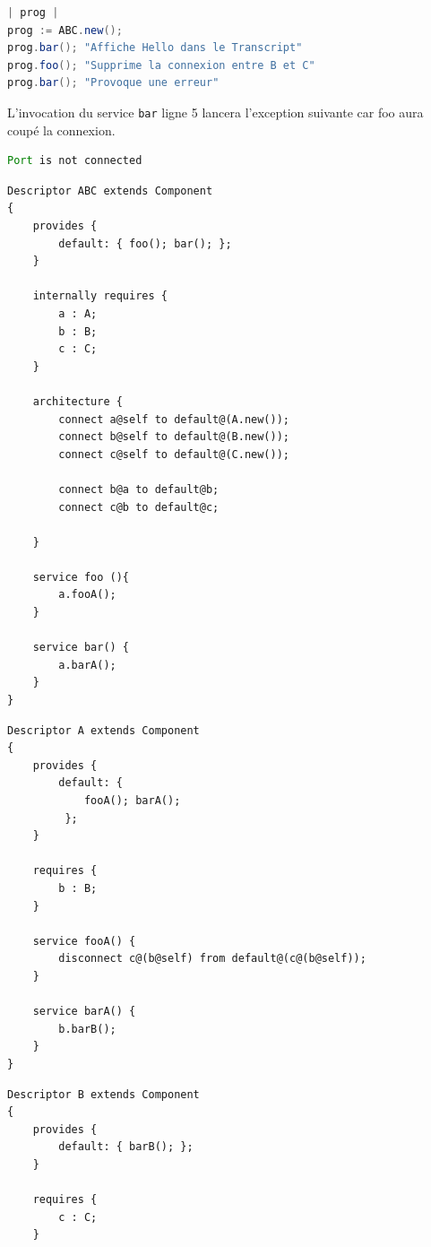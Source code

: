 \documentclass[11pt,a4paper,openany,oneside]{book}
\begin{document}
\begin{appendices}
\begin{lstlisting}[language=Java, frame=single, caption=Workspace]
| prog |
prog := ABC.new();
prog.bar(); "Affiche Hello dans le Transcript"
prog.foo(); "Supprime la connexion entre B et C"
prog.bar(); "Provoque une erreur" 
\end{lstlisting}

L'invocation du service \texttt{bar} ligne 5 lancera l'exception suivante car foo aura coupé la connexion.


\begin{lstlisting}[language=Java, frame=single, caption=Erreur lors de l'exécution du 2e bar(),label=exceptionnotconnected]
Port is not connected
\end{lstlisting}


\begin{lstlisting}[language=Compo, frame=single, caption=Exemple d'une déconnexion à distance]
Descriptor ABC extends Component
{
	provides {
		default: { foo(); bar(); };
	}
	
	internally requires {
		a : A;
		b : B;
		c : C;
	}
	
	architecture {
		connect a@self to default@(A.new());
		connect b@self to default@(B.new());
		connect c@self to default@(C.new());
		
		connect b@a to default@b;
		connect c@b to default@c;
	
	}
	
	service foo (){
		a.fooA();
	}
	
	service bar() {
		a.barA();
	}
}
\end{lstlisting}



\clearpage

\begin{lstlisting}[language=Compo, frame=single, caption=Programme A]
Descriptor A extends Component
{
	provides {
		default: {
			fooA();	barA();
		 };
	}
	
	requires {
		b : B;
	}
	
	service fooA() {
		disconnect c@(b@self) from default@(c@(b@self));
	}
	
	service barA() {
		b.barB();
	}
}
\end{lstlisting}


\begin{lstlisting}[language=Compo, frame=single, caption=Programme B]
Descriptor B extends Component
{
	provides {
		default: { barB(); };
	}
	
	requires {
		c : C;
	}
	

\end{lstlisting}
\end{appendices}
\end{document}
